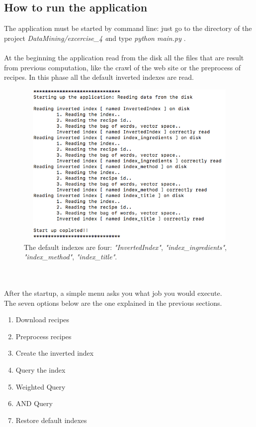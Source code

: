 \documentclass[oneside]{article}			%
\begin{document}
	\subsection{How to run the application}
		The application must be started by command line: just go to the directory of the project \textit{DataMining/excercise\_4 a}nd type \textit{python main.py} .
		\\\\
		At the beginning the application read from the disk all the files that are result from previous computation, like the crawl of the web site or the preprocess of recipes. In this phase all the default inverted indexes are read.
		\begin{figure}[h]
			\includegraphics[width=12cm, height=8cm]{./report_file/app/startup.png}\caption{The default indexes are four: \textit{"InvertedIndex"}, \textit{"index\_ingredients"}, \textit{"index\_method"}, \textit{"index\_title"}.}
		\end{figure}
		\\\\
		After the startup, a simple menu asks you what job you would execute.
		\\
		The seven options below are the one explained in the previous sections.
		\begin{enumerate}[label=\arabic*.]
			\item Download recipes
			\item Preprocess recipes
			\item Create the inverted index
			\item Query the index
			\item Weighted Query
			\item AND Query
			\item Restore default indexes
		\end{enumerate}
\end{document}
